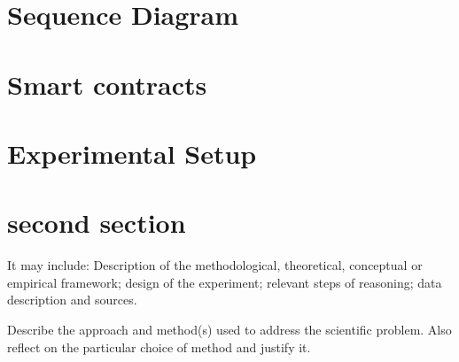 \section{Sequence Diagram}
\section{Smart contracts}
\section{Experimental Setup} \label{sec:sectionlabel}
\section{second section}
It may include: Description of the methodological, theoretical, conceptual or empirical framework; design of the
experiment; relevant steps of reasoning; data description and sources.

Describe the approach and method(s) used to address the scientific problem. Also reflect on the particular choice of method and justify it.
